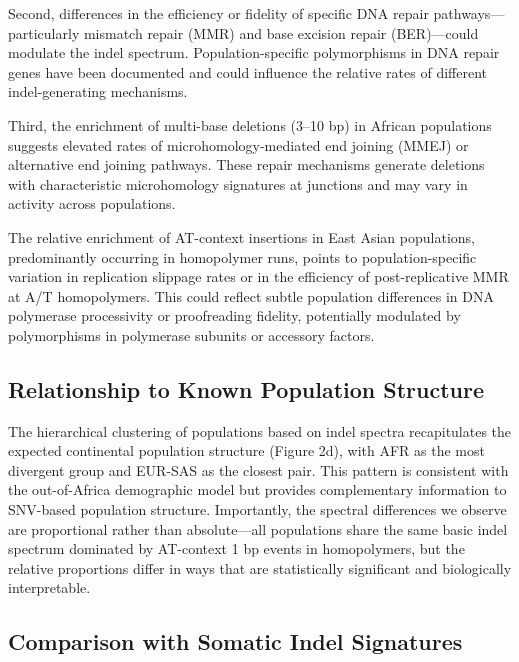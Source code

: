 \documentclass[11pt,a4paper]{article}
\begin{document}
Second, differences in the efficiency or fidelity of specific DNA repair pathways---particularly mismatch repair (MMR) and base excision repair (BER)---could modulate the indel spectrum. Population-specific polymorphisms in DNA repair genes have been documented \citep{mathonnet2003variable} and could influence the relative rates of different indel-generating mechanisms.

Third, the enrichment of multi-base deletions (3--10 bp) in African populations suggests elevated rates of microhomology-mediated end joining (MMEJ) or alternative end joining pathways. These repair mechanisms generate deletions with characteristic microhomology signatures at junctions \citep{mcvey2008mmej} and may vary in activity across populations.

The relative enrichment of AT-context insertions in East Asian populations, predominantly occurring in homopolymer runs, points to population-specific variation in replication slippage rates or in the efficiency of post-replicative MMR at A/T homopolymers. This could reflect subtle population differences in DNA polymerase processivity or proofreading fidelity, potentially modulated by polymorphisms in polymerase subunits or accessory factors.

\subsection{Relationship to Known Population Structure}

The hierarchical clustering of populations based on indel spectra recapitulates the expected continental population structure (Figure 2d), with AFR as the most divergent group and EUR-SAS as the closest pair. This pattern is consistent with the out-of-Africa demographic model \citep{henn2012great} but provides complementary information to SNV-based population structure. Importantly, the spectral differences we observe are proportional rather than absolute---all populations share the same basic indel spectrum dominated by AT-context 1 bp events in homopolymers, but the relative proportions differ in ways that are statistically significant and biologically interpretable.

\subsection{Comparison with Somatic Indel Signatures}
\end{document}
